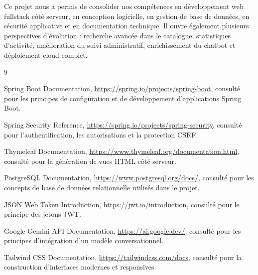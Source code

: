 \documentclass[12pt,a4paper]{report}
\begin{document}
Ce projet nous a permis de consolider nos compétences en développement web fullstack côté serveur, en conception logicielle, en gestion de base de données, en sécurité applicative et en documentation technique. Il ouvre également plusieurs perspectives d'évolution : recherche avancée dans le catalogue, statistiques d'activité, amélioration du suivi administratif, enrichissement du chatbot et déploiement cloud complet.

\begin{thebibliography}{9}
    Spring Boot Documentation, \url{https://spring.io/projects/spring-boot}, consulté pour les principes de configuration et de développement d'applications Spring Boot.

    Spring Security Reference, \url{https://spring.io/projects/spring-security}, consulté pour l'authentification, les autorisations et la protection CSRF.

    Thymeleaf Documentation, \url{https://www.thymeleaf.org/documentation.html}, consulté pour la génération de vues HTML côté serveur.

    PostgreSQL Documentation, \url{https://www.postgresql.org/docs/}, consulté pour les concepts de base de données relationnelle utilisés dans le projet.

    JSON Web Token Introduction, \url{https://jwt.io/introduction}, consulté pour le principe des jetons JWT.

    Google Gemini API Documentation, \url{https://ai.google.dev/}, consulté pour les principes d'intégration d'un modèle conversationnel.

    Tailwind CSS Documentation, \url{https://tailwindcss.com/docs}, consulté pour la construction d'interfaces modernes et responsives.
\end{thebibliography}
\end{document}
